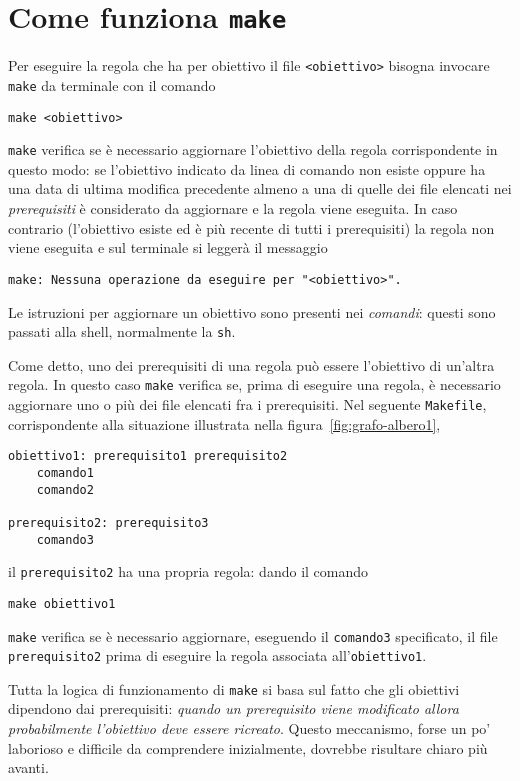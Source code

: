 \section{Come funziona \texttt{make}}
\label{sec:come-funziona}

Per eseguire la regola che ha per obiettivo il file \verb|<obiettivo>| bisogna
invocare \verb|make| da terminale con il comando
\begin{verbatim}
make <obiettivo>
\end{verbatim}
\verb|make| verifica se è necessario aggiornare l'obiettivo della regola
corrispondente in questo modo: se l'obiettivo indicato da linea di comando non
esiste oppure ha una data di ultima modifica precedente almeno a una di quelle
dei file elencati nei \emph{prerequisiti} è considerato da aggiornare e la
regola viene eseguita.  In caso contrario (l'obiettivo esiste ed è più recente
di tutti i prerequisiti) la regola non viene eseguita e sul terminale si leggerà
il messaggio
\begin{verbatim}
make: Nessuna operazione da eseguire per "<obiettivo>".
\end{verbatim}
Le istruzioni per aggiornare un obiettivo sono
presenti nei \emph{comandi}: questi sono passati alla shell, normalmente la
\verb|sh|.

Come detto, uno dei prerequisiti di una regola può essere l'obiettivo di
un'altra regola.  In questo caso \verb|make| verifica se, prima di eseguire una
regola, è necessario aggiornare uno o più dei file elencati fra i prerequisiti.
Nel seguente \verb|Makefile|, corrispondente alla situazione illustrata nella
figura~\ref{fig:grafo-albero1},
\begin{lstlisting}
obiettivo1: prerequisito1 prerequisito2
	comando1
	comando2

prerequisito2: prerequisito3
	comando3
\end{lstlisting}
il \verb|prerequisito2| ha una propria regola: dando il comando
\begin{verbatim}
make obiettivo1
\end{verbatim}
\verb|make| verifica se è necessario aggiornare, eseguendo il \verb|comando3|
specificato, il file \verb|prerequisito2| prima di eseguire la regola associata
all'\verb|obiettivo1|.

Tutta la logica di funzionamento di \verb|make| si basa sul fatto che gli
obiettivi dipendono dai prerequisiti:
\emph{quando un prerequisito viene modificato allora probabilmente l'obiettivo
  deve essere ricreato}.
Questo meccanismo, forse un po' laborioso e difficile da comprendere
inizialmente, dovrebbe risultare chiaro più avanti.

